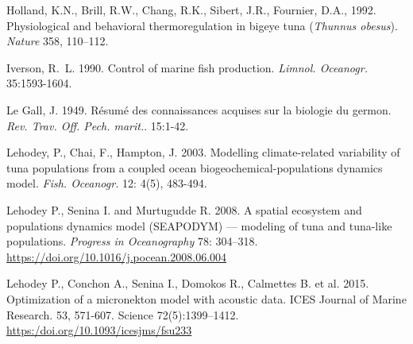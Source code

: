 \begin{thebibliography}{}
 Holland, K.N., Brill, R.W., Chang, R.K., Sibert, J.R., Fournier, D.A., 1992. Physiological and behavioral thermoregulation in bigeye tuna (\textit{Thunnus obesus}). \textit{Nature} 358, 110–112.

 Iverson, R.~L. 1990. Control of marine fish production. \textit{Limnol. Oceanogr.} 35:1593-1604.

 Le Gall, J. 1949. Résumé des connaissances acquises sur la biologie du germon. \textit{Rev. Trav. Off. Pech. marit.}. 15:1-42.



%
 Lehodey, P., Chai, F., Hampton, J. 2003. Modelling climate-related variability of tuna populations from a coupled ocean biogeochemical-populations dynamics model. \textit {Fish. Oceanogr.} 12: 4(5), 483-494.

 Lehodey P., Senina I. and Murtugudde R. 2008. A spatial ecosystem and populations dynamics model (SEAPODYM) — modeling of tuna and tuna-like populations. \textit {Progress in Oceanography} 78: 304–318. \url{https://doi.org/10.1016/j.pocean.2008.06.004}

%
%
 Lehodey P., Conchon A., Senina I., Domokos R., Calmettes B. et al. 2015. Optimization of a micronekton model with acoustic data. ICES Journal of Marine Research. 53, 571-607. Science 72(5):1399–1412. \url{https:/doi.org/10.1093/icesjms/fsu233}


\end{thebibliography}
